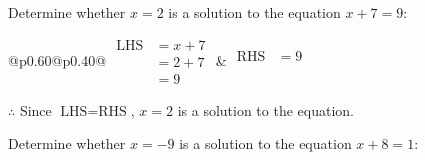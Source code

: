 \documentclass[12pt]{article}
\newcounter{minipagecount}
\begin{document}
\begin{multicols}{2}
\begin{minipage}[t]{0.40\textwidth}
    \noindent Determine whether \(x = 2\) is a solution to the equation \(x + 7 = 9\):
    \vspace{4pt}  %

    \noindent
    \renewcommand{\arraystretch}{1.3} %
    \begin{tabular}{@{}p{0.60\linewidth}@{}p{0.40\linewidth}@{}}
        \(\begin{aligned}
            \text{LHS} &= x + 7 \\
                    &= 2 + 7 \\
                    &= 9 
        \end{aligned}\) &
        \(\begin{aligned}
            \text{RHS} &= 9\\
                    & \\
                    &
        \end{aligned}\)
    \end{tabular}
    \renewcommand{\arraystretch}{1.0} %
    \vspace{2pt}  %

    \noindent \(\therefore\) Since \(\text{LHS} = \text{RHS}\), \(x = 2\) is  a solution to the equation.

\end{minipage}

 \vspace*{16pt}
\noindent{(\theminipagecount)}\hspace{0.1mm} %
\begin{minipage}[t]{0.40\textwidth} %

    \noindent Determine whether \(x = -9\) is a solution to the equation \(x + 8 = 1\):
    \vspace{4pt}  %


\end{minipage}
\end{multicols}
\end{document}
